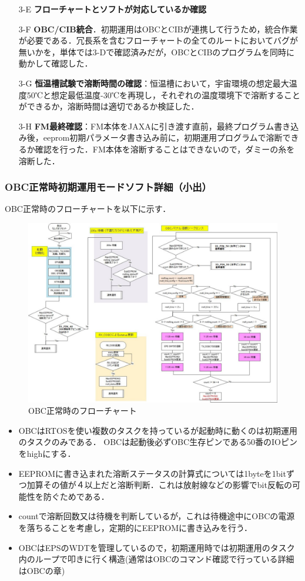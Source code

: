 \begin{itemize}
	\item[3-E] \textbf{フローチャートとソフトが対応しているか確認}
	\item[3-F] \textbf{OBC/CIB統合}．初期運用はOBCとCIBが連携して行うため，統合作業が必要である．冗長系を含むフローチャートの全てのルートにおいてバグが無いかを，単体では3-Dで確認済みだが，OBCとCIBのプログラムを同時に動かして確認した．
	\item[3-G] \textbf{恒温槽試験で溶断時間の確認}：恒温槽において，宇宙環境の想定最大温度50℃と想定最低温度-30℃を再現し，それぞれの温度環境下で溶断することができるか，溶断時間は適切であるか検証した．
	\item[3-H] \textbf{FM最終確認}：FM本体をJAXAに引き渡す直前，最終プログラム書き込み後，eeprom初期パラメータ書き込み前に，初期運用プログラムで溶断できるか確認を行った．FM本体を溶断することはできないので，ダミーの糸を溶断した．
	
\end{itemize}	

\subsubsection{OBC正常時初期運用モードソフト詳細（小出）}
OBC正常時のフローチャートを以下に示す．
\begin{figure}[H]
	\centering
	\includegraphics[scale=0.7]{03/fig/3-4-Ini-1.pdf}
	\caption{OBC正常時のフローチャート}
	\label{fig3-4-Ini-1}
\end{figure}	
\begin{itemize}
	\item OBCはRTOSを使い複数のタスクを持っているが起動時に動くのは初期運用のタスクのみである．
	OBCは起動後必ずOBC生存ピンである50番のIOピンをhighにする．
	\item EEPROMに書き込まれた溶断ステータスの計算式については1byteを1bitずつ加算その値が４以上だと溶断判断．これは放射線などの影響でbit反転の可能性を防ぐためである．
	\item countで溶断回数又は待機を判断しているが，これは待機途中にOBCの電源を落ちることを考慮し，定期的にEEPROMに書き込みを行う．
	\item OBCはEPSのWDTを管理しているので，初期運用時では初期運用のタスク内のループで叩きに行く構造(通常はOBCのコマンド確認で行っている詳細はOBCの章)
\end{itemize}
